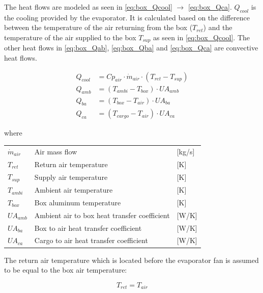 The heat flows are modeled as seen in \cref{eq:box_Qcool} $\rightarrow$ \cref{eq:box_Qca}. $Q_{cool}$ is the cooling provided by the evaporator. It is calculated based on the difference between the temperature of the air returning from the box ($T_{ret}$) and the temperature of the air supplied to the box $T_{sup}$ as seen in \cref{eq:box_Qcool}. The other heat flows in \cref{eq:box_Qab}, \cref{eq:box_Qba} and \cref{eq:box_Qca} are convective heat flows.


\begin{align}
	Q_{cool}   & = Cp_{air} \cdot \dot{m}_{air} \cdot (T_{ret} - T_{sup})	\label{eq:box_Qcool} \\
	Q_{amb}    & = (T_{ambi} - T_{box}) \cdot U A_{amb}						\label{eq:box_Qab}   \\
	Q_{ba}     & = (T_{box} - T_{air}) \cdot U A_{ba}						\label{eq:box_Qba}   \\
	Q_{ca}     & = (T_{cargo} - T_{air}) \cdot U A_{ca}                  	\label{eq:box_Qca}
\end{align}

where
\begin{center}
	\begin{tabular}{l p{8cm} l}
		$\dot{m}_{air}$ & Air mass flow                                & [\si{kg}/{\si{s}}] \\
		$T_{ret}$       & Return air temperature                       & [\si{K}]           \\
		$T_{sup}$       & Supply air temperature                       & [\si{K}]           \\
		$T_{ambi}$      & Ambient air temperature                      & [\si{K}]           \\
		$T_{box}$       & Box aluminum temperature                     & [\si{K}]           \\
		$U A_{amb}$     & Ambient air to box heat transfer coefficient & [\si{W}/\si{K}]    \\
		$U A_{ba}$      & Box to air heat transfer coefficient         & [\si{W}/\si{K}]    \\
		$U A_{ca}$  	& Cargo to air heat transfer coefficient       & [\si{W}/\si{K}]    \\
	\end{tabular}
\end{center}


The return air temperature which is located before the evaporator fan is assumed to be equal to the box air temperature:

\begin{equation} \label{eq:box_Tref}
	T_{ret} = T_{air}
\end{equation}



